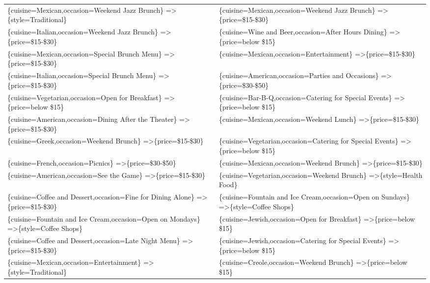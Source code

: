 \documentclass[letterpaper,10pt]{article}
\begin{document}
\begin{appendices}
\begin{table}[h]
\begin{adjustbox}{max width=\textwidth}
\begin{tabular}{ll}
\{cuisine=Mexican,occasion=Weekend Jazz Brunch\} =\textgreater \{style=Traditional\} & \{cuisine=Mexican,occasion=Weekend Jazz Brunch\} =\textgreater \{price=\$15-\$30\} \\ 
\{cuisine=Italian,occasion=Weekend Jazz Brunch\} =\textgreater \{price=\$15-\$30\} & \{cuisine=Wine and Beer,occasion=After Hours Dining\} =\textgreater \{price=below \$15\} \\ 
\{cuisine=Mexican,occasion=Special Brunch Menu\} =\textgreater \{price=\$15-\$30\} & \{cuisine=Mexican,occasion=Entertainment\} =\textgreater \{price=\$15-\$30\} \\ 
\{cuisine=Italian,occasion=Special Brunch Menu\} =\textgreater \{price=\$15-\$30\} & \{cuisine=American,occasion=Parties and Occasions\} =\textgreater \{price=\$30-\$50\} \\ 
\{cuisine=Vegetarian,occasion=Open for Breakfast\} =\textgreater \{price=below \$15\} & \{cuisine=Bar-B-Q,occasion=Catering for Special Events\} =\textgreater \{price=below \$15\} \\ 
\{cuisine=American,occasion=Dining After the Theater\} =\textgreater \{price=\$15-\$30\} & \{cuisine=Mexican,occasion=Weekend Lunch\} =\textgreater \{price=\$15-\$30\} \\ 
\{cuisine=Greek,occasion=Weekend Brunch\} =\textgreater \{price=\$15-\$30\} & \{cuisine=Vegetarian,occasion=Catering for Special Events\} =\textgreater \{price=below \$15\} \\ 
\{cuisine=French,occasion=Picnics\} =\textgreater \{price=\$30-\$50\} & \{cuisine=Mexican,occasion=Weekend Brunch\} =\textgreater \{price=\$15-\$30\} \\ 
\{cuisine=American,occasion=See the Game\} =\textgreater \{price=\$15-\$30\} & \{cuisine=Vegetarian,occasion=Weekend Brunch\} =\textgreater \{style=Health Food\} \\ 
\{cuisine=Coffee and Dessert,occasion=Fine for Dining Alone\} =\textgreater \{price=\$15-\$30\} & \{cuisine=Fountain and Ice Cream,occasion=Open on Sundays\} =\textgreater \{style=Coffee Shops\} \\ 
\{cuisine=Fountain and Ice Cream,occasion=Open on Mondays\} =\textgreater \{style=Coffee Shops\} & \{cuisine=Jewish,occasion=Open for Breakfast\} =\textgreater \{price=below \$15\} \\ 
\{cuisine=Coffee and Dessert,occasion=Late Night Menu\} =\textgreater \{price=\$15-\$30\} & \{cuisine=Jewish,occasion=Catering for Special Events\} =\textgreater \{price=below \$15\} \\ 
\{cuisine=Mexican,occasion=Entertainment\} =\textgreater \{style=Traditional\} & \{cuisine=Creole,occasion=Weekend Brunch\} =\textgreater \{price=below \$15\} \\ 

\end{tabular}
\end{adjustbox}
\end{table}
\end{appendices}
\end{document}
